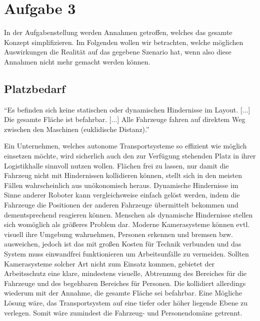 \documentclass[ngerman]{tudscrreprt}
\begin{document}
\chapter{Aufgabe 3}
In der Aufgabenstellung werden Annahmen getroffen, welches das gesamte Konzept simplifizieren. Im Folgenden wollen wir betrachten, welche möglichen Auswirkungen die Realität auf das gegebene Szenario hat, wenn also diese Annahmen nicht mehr gemacht werden können.

\section{Platzbedarf}
\begin{displayquote}
    ``Es befinden sich keine statischen oder dynamischen Hindernisse im Layout. [...] Die gesamte Fläche ist befahrbar. [...] Alle Fahrzeuge fahren auf direktem Weg zwischen den Maschinen (euklidische Distanz).'' \cite{aufgabenstellung}
\end{displayquote}
%
Ein Unternehmen, welches autonome Transportsysteme so effizient wie möglich einsetzen möchte, wird sicherlich auch den zur Verfügung stehenden Platz in ihrer Logistikhalle sinnvoll nutzen wollen. Flächen frei zu lassen, nur damit die Fahrzeug nicht mit Hindernissen kollidieren können, stellt sich in den meisten Fällen wahrscheinlich aus unökonomisch heraus. Dynamische Hindernisse im Sinne anderer Roboter kann vergleichsweise einfach gelöst werden, indem die Fahrzeuge die Positionen der anderen Fahrzeuge übermittelt bekommen und dementsprechend reagieren können. Menschen als dynamische Hindernisse stellen sich womöglich als größeres Problem dar. Moderne Kamerasysteme können evtl. visuell ihre Umgebung wahrnehmen, Personen erkennen und bremsen bzw. ausweichen, jedoch ist das mit großen Kosten für Technik verbunden und das System muss einwandfrei funktionieren um Arbeitsunfälle zu vermeiden. Sollten Kamerasysteme solcher Art nicht zum Einsatz kommen, gebietet der Arbeitsschutz eine klare, mindestens visuelle, Abtrennung des Bereiches für die Fahrzeuge und des begehbaren Bereiches für Personen. Die kollidiert allerdings wiederum mit der Annahme, die gesamte Fläche sei befahrbar. Eine Mögliche Lösung wäre, das Transportsystem auf eine tiefer oder höher liegende Ebene zu verlegen. Somit wäre zumindest die Fahrzeug- und Personendomäne getrennt.
\end{document}
